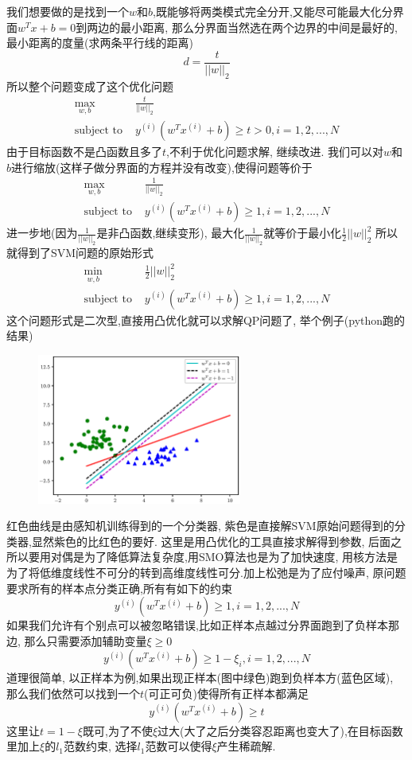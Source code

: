 \documentclass[12pt,letterpaper]{article}
\begin{document}
 我们想要做的是找到一个$w$和$b$,既能够将两类模式完全分开,又能尽可能最大化分界面$w^Tx+b=0$到两边的最小距离, 那么分界面当然选在两个边界的中间是最好的,
 最小距离的度量(求两条平行线的距离)
 \[
	 d = \frac{t}{||w||_2}
 \]
 所以整个问题变成了这个优化问题
 \[
    \begin{split} 
	 \max_{w,b}\quad  & \frac{t}{||w||_2} \\
	 \text{subject to } &  y^{(i)}(w^Tx^{(i)}+b) \geq t > 0 , i = 1,2,...,N 
	 \end{split} 
 \]
由于目标函数不是凸函数且多了$t$,不利于优化问题求解, 继续改进.
我们可以对$w$和$b$进行缩放(这样子做分界面的方程并没有改变),使得问题等价于
\[
    \begin{split} 
    \max_{w,b}\quad  & \frac{1}{||w||_2} \\
    \text{subject to } &  y^{(i)}(w^Tx^{(i)}+b) \geq 1 , i = 1,2,...,N 
    \end{split} 	
\]
 进一步地(因为$\frac{1}{||w||_2}$是非凸函数,继续变形), 最大化$\frac{1}{||w||_2}$就等价于最小化$\frac{1}{2}||w||_2^2$
 所以就得到了SVM问题的原始形式
 \[
    \begin{split} 
    \min_{w,b}\quad  & \frac{1}{2}{||w||_2^2} \\
    \text{subject to } &  y^{(i)}(w^Tx^{(i)}+b) \geq 1 , i = 1,2,...,N 
    \end{split} 	 
 \]
 这个问题形式是二次型,直接用凸优化就可以求解QP问题了, 举个例子(python跑的结果)
 \begin{figure}[H]
 	\centering
 	\includegraphics[width=0.6\textwidth, height=0.3\textheight] {svm_p}
 \end{figure}
红色曲线是由感知机训练得到的一个分类器, 紫色是直接解SVM原始问题得到的分类器,显然紫色的比红色的要好. 这里是用凸优化的工具直接求解得到参数, 后面之所以要用对偶是为了降低算法复杂度,用SMO算法也是为了加快速度,  用核方法是为了将低维度线性不可分的转到高维度线性可分.加上松弛是为了应付噪声, 原问题要求所有的样本点分类正确,所有有如下的约束
\[
   y^{(i)}(w^Tx^{(i)}+b) \geq 1 , i = 1,2,...,N
\] 
如果我们允许有个别点可以被忽略错误,比如正样本点越过分界面跑到了负样本那边, 
那么只需要添加辅助变量$\xi \geq 0$
\[
  y^{(i)}(w^Tx^{(i)}+b) \geq 1 - \xi_i, i = 1,2,...,N	
\]
道理很简单, 以正样本为例,如果出现正样本(图中绿色)跑到负样本方(蓝色区域), 
那么我们依然可以找到一个$t$(可正可负)使得所有正样本都满足
\[
   y^{(i)}(w^Tx^{(i)}+b) \geq t
\]
这里让$t= 1- \xi$既可,为了不使$\xi$过大(大了之后分类容忍距离也变大了),在目标函数里加上$\xi$的$l_1$范数约束, 选择$l_1$范数可以使得$\xi$产生稀疏解.
\end{document}
